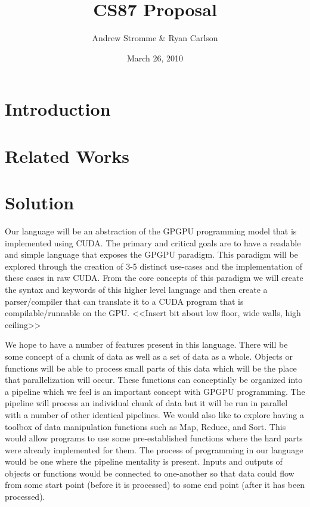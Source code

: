 \documentclass{article}
\begin{document}
\title{CS87 Proposal}
\author{Andrew Stromme \& Ryan Carlson}
\date{March 26, 2010}
\maketitle

\section{Introduction}

\section{Related Works}

\section{Solution}
Our language will be an abstraction of the GPGPU programming model that is implemented using CUDA. The primary and critical goals are to have a readable and simple language that exposes the GPGPU paradigm. This paradigm will be explored through the creation of 3-5 distinct use-cases and the implementation of these cases in raw CUDA. From the core concepts of this paradigm we will create the syntax and keywords of this higher level language and then create a parser/compiler that can translate it to a CUDA program that is compilable/runnable on the GPU. <<Insert bit about low floor, wide walls, high ceiling>>

We hope to have a number of features present in this language. There will be some concept of a chunk of data as well as a set of data as a whole. Objects or functions will be able to process small parts of this data which will be the place that parallelization will occur. These functions can conceptially be organized into a pipeline which we feel is an important concept with GPGPU programming. The pipeline will process an individual chunk of data but it will be run in parallel with a number of other identical pipelines. We would also like to explore having a toolbox of data manipulation functions such as Map, Reduce, and Sort. This would allow programs to use some pre-established functions where the hard parts were already implemented for them. The process of programming in our language would be one where the pipeline mentality is present. Inputs and outputs of objects or functions would be connected to one-another so that data could flow from some start point (before it is processed) to some end point (after it has been processed).
\end{document}
